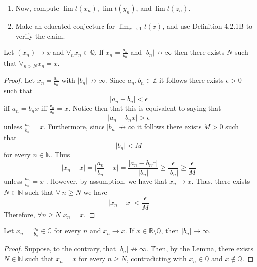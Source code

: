 \begin{enumerate}
\begin{enumerate}
        \item Now, compute \( \lim t(x_{n})\), \( \lim t(y_{n}) \), and \( \lim t(z_{n}) \). 
        
        \item Make an educated conjecture for \( \lim_{x \rightarrow 1} t(x) \), and use Definition 4.2.1B to verify the claim. 
    \end{enumerate}
    
        \begin{lemma}
    Let \( (x_{n}) \rightarrow x \) and \( \forall_{n} x_{n} \in \mathbb{Q} \). If \( x_{n} = \frac{a_{n}}{b_{n}} \) and \( \vert b_{n} \vert \not\rightarrow \infty \) then there exists \( N \) such that \( \forall_{n > N} x_{n} = x \). 
    \end{lemma}
    \begin{proof}
    Let \( x_{n} = \frac{a_{n}}{b_{n}} \) with \( \vert b_{n} \vert \not\rightarrow \infty \). Since \( a_{n},b_{n} \in \mathbb{Z} \) it follows there exists \( \epsilon > 0 \) such that
    \[
    \vert a_{n} - b_{n} \vert < \epsilon
    \]
    iff \( a_{n} = b_{n} x \) iff \( \frac{a_{n}}{b_{n}} = x \). Notice then that this is equivalent to saying that 
    \[
    \vert a_{n} - b_{n}x \vert > \epsilon
    \]
    unless \( \frac{a_{n}}{b_{n}} = x \). Furthermore, since \( \vert b_{n} \vert \not\rightarrow \infty \) it follows there exists \( M > 0 \) such that 
    \[
    \vert b_{n} \vert < M
    \]
    for every \( n \in \mathbb{N} \). Thus 
    \[
    \vert x_{n} - x \vert = \vert \frac{a_{n}}{b_{n}} - x \vert = \frac{\vert a_{n} - b_{n}x \vert}{\vert b_{n} \vert} \geq \frac{\epsilon}{\vert b_{n} \vert} \geq \frac{\epsilon}{M}
    \]
    unless \( \frac{a_{n}}{b_{n}} = x \) . However, by assumption, we have that \( x_{n} \rightarrow x \). Thus, there exists \( N \in \mathbb{N} \) such that \( \forall \: n \geq N \) we have
    \[
    \vert x_{n} - x \vert < \frac{\epsilon}{M}
    \]
    Therefore, \( \forall n \geq N \) \(x_{n} = x \). 
    \end{proof}
    \begin{corollary}
    Let \( x_{n} = \frac{a_{n}}{b_{n}}\in \mathbb{Q} \) for every \( n \) and \( x_{n} \rightarrow x \). If \( x \in \mathbb{R}\setminus\mathbb{Q} \), then \( \vert b_{n} \vert \rightarrow \infty \).  
    \end{corollary}
    \begin{proof}
    Suppose, to the contrary, that \( \vert b_{n} \vert \not\rightarrow \infty \). Then, by the Lemma, there exists \( N \in \mathbb{N} \) such that \( x_{n} = x \) for every \( n \geq N \), contradicting with \( x_{n} \in \mathbb{Q} \) and \( x \not\in \mathbb{Q} \). 
    \end{proof}
    

\end{enumerate}
